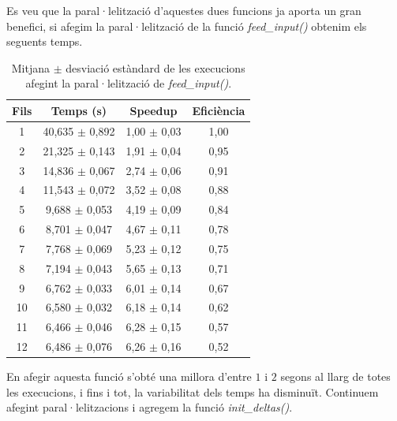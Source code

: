 \documentclass{article}
\begin{document}
Es veu que la paral·lelització d'aquestes dues funcions ja aporta un gran benefici, si afegim la paral·lelització de la funció \textit{feed\_input()} obtenim els seguents temps.

\begin{table}[H]
\centering
\begin{tabular}{|c|c|c|c|}
\hline
\textbf{Fils} & \textbf{Temps (s)} & \textbf{Speedup} & \textbf{Eficiència} \\ \hline
1 & 40,635 $\pm$ 0,892 & 1,00 $\pm$ 0,03 & 1,00 \\ \hline
2 & 21,325 $\pm$ 0,143 & 1,91 $\pm$ 0,04 & 0,95 \\ \hline
3 & 14,836 $\pm$ 0,067 & 2,74 $\pm$ 0,06 & 0,91 \\ \hline
4 & 11,543 $\pm$ 0,072 & 3,52 $\pm$ 0,08 & 0,88 \\ \hline
5 & 9,688 $\pm$ 0,053 & 4,19 $\pm$ 0,09 & 0,84 \\ \hline
6 & 8,701 $\pm$ 0,047 & 4,67 $\pm$ 0,11 & 0,78 \\ \hline
7 & 7,768 $\pm$ 0,069 & 5,23 $\pm$ 0,12 & 0,75 \\ \hline
8 & 7,194 $\pm$ 0,043 & 5,65 $\pm$ 0,13 & 0,71 \\ \hline
9 & 6,762 $\pm$ 0,033 & 6,01 $\pm$ 0,14 & 0,67 \\ \hline
10 & 6,580 $\pm$ 0,032 & 6,18 $\pm$ 0,14 & 0,62 \\ \hline
11 & 6,466 $\pm$ 0,046 & 6,28 $\pm$ 0,15 & 0,57 \\ \hline
12 & 6,486 $\pm$ 0,076 & 6,26 $\pm$ 0,16 & 0,52 \\ \hline
\end{tabular}
\caption{Mitjana $\pm$ desviació estàndard de les execucions afegint la paral·lelització de \textit{feed\_input()}.}
\label{tab:resultats5}
\end{table}

En afegir aquesta funció s'obté una millora d'entre $1$ i $2$ segons al llarg de totes les execucions, i fins i tot, la variabilitat dels temps ha disminuït. Continuem afegint paral·lelitzacions i agregem la funció \textit{init\_deltas()}.
\end{document}
